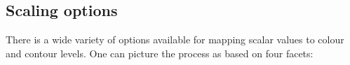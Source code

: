 \documentclass[11pt]{article}
\begin{document}


  


\subsection{Scaling options}
\label{sec:scaling} 

There is a wide variety of options available for mapping scalar values to
colour and contour levels.  One can picture the process as based on four
facets: 
\end{document}

